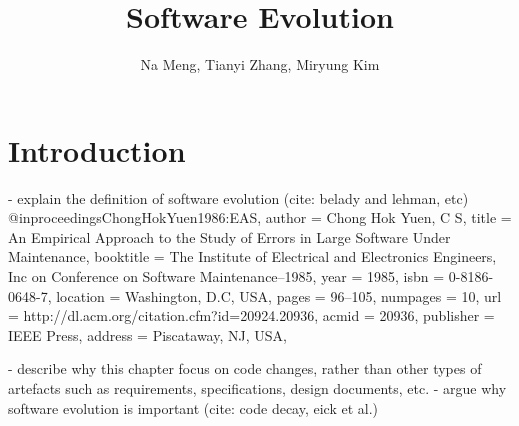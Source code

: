 \documentclass[runningheads,a4paper]{llncs}
\begin{document}
\mainmatter  %

\title{Software Evolution} 


%
%
\author{Na Meng, Tianyi Zhang, Miryung Kim} 



\maketitle


\begin{abstract}
\end{abstract}


\section{Introduction}
- explain the definition of software evolution (cite: belady and lehman, etc)
\cite{Belady1976:ModelEvolution} 
@inproceedings{ChongHokYuen1986:EAS,
 author = {Chong Hok Yuen, C S},
 title = {An Empirical Approach to the Study of Errors in Large Software Under Maintenance},
 booktitle = {The Institute of Electrical and Electronics Engineers, Inc on Conference on Software Maintenance--1985},
 year = {1985},
 isbn = {0-8186-0648-7},
 location = {Washington, D.C, USA},
 pages = {96--105},
 numpages = {10},
 url = {http://dl.acm.org/citation.cfm?id=20924.20936},
 acmid = {20936},
 publisher = {IEEE Press},
 address = {Piscataway, NJ, USA},
} 

- describe why this chapter focus on code changes, rather than other types of artefacts such as requirements, specifications, design documents, etc. 
- argue why software evolution is important (cite: code decay, eick et al.) 
\cite{Eick2001:CodeDecay}
\end{document}
